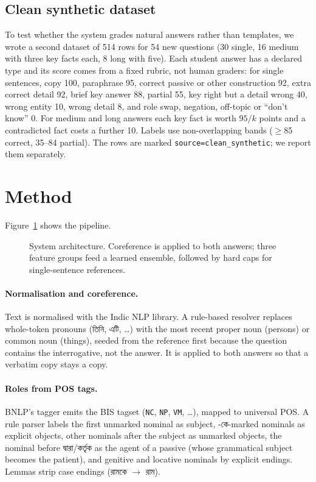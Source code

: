 \documentclass[10pt,a4paper,twocolumn]{article}
\newcommand{\bn}[1]{{\bengalifont #1}}
\begin{document}
\subsection{Clean synthetic dataset}\label{sec:clean}
To test whether the system grades natural answers rather than templates, we
wrote a second dataset of 514 rows for 54 new questions (30 single, 16
medium with three key facts each, 8 long with five). Each student answer has
a declared type and its score comes from a fixed rubric, not human graders:
for single sentences, copy 100, paraphrase 95, correct passive or other
construction 92, extra correct detail 92, brief key answer 88, partial 55,
key right but a detail wrong 40, wrong entity 10, wrong detail 8, and role
swap, negation, off-topic or ``don't know'' 0. For medium and long answers each
key fact is worth $95/k$ points and a contradicted fact costs a further 10.
Labels use non-overlapping bands ($\geq$85 correct, 35--84 partial). The rows
are marked \texttt{source=clean\_synthetic}; we report them separately.

\section{Method}\label{sec:method}
Figure~\ref{fig:arch} shows the pipeline.

\begin{figure}[t]
\centering

\caption{System architecture. Coreference is applied to both answers; three feature groups feed a learned ensemble, followed by hard caps for single-sentence references.}
\label{fig:arch}
\end{figure}

\paragraph{Normalisation and coreference.}
Text is normalised with the Indic NLP library. A rule-based resolver replaces
whole-token pronouns (\bn{তিনি}, \bn{এটি}, \ldots) with the most recent
proper noun (persons) or common noun (things), seeded from the reference
first because the question contains the interrogative, not the answer. It is
applied to both answers so that a verbatim copy stays a copy.

\paragraph{Roles from POS tags.}
BNLP's tagger emits the BIS tagset (\texttt{NC}, \texttt{NP}, \texttt{VM},
\ldots), mapped to universal POS. A rule parser labels the first unmarked
nominal as subject, \bn{-কে}-marked nominals as explicit objects, other
nominals after the subject as unmarked objects, the nominal before
\bn{দ্বারা}/\bn{কর্তৃক} as the agent of a passive (whose grammatical subject
becomes the patient), and genitive and locative nominals by explicit
endings. Lemmas strip case endings (\bn{রামকে} $\rightarrow$ \bn{রাম}).
\end{document}

